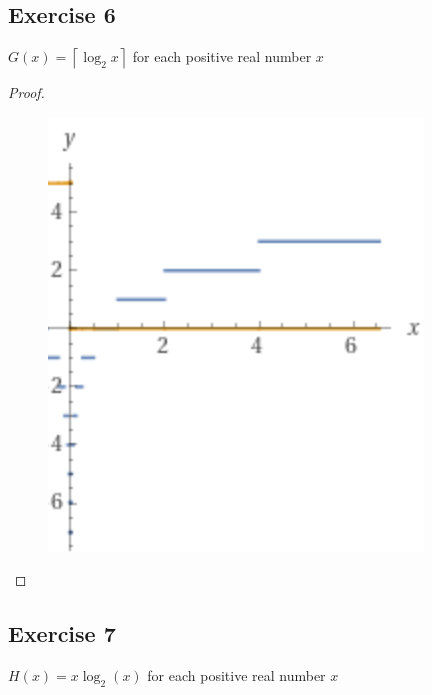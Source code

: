 \documentclass[14pt]{extarticle}
\newcommand{\ceil}[1]{{\left\lceil#1\right\rceil}}
\begin{document}
\subsection{Exercise 6}
\(G(x) = \ceil{\log_2 x}\) for each positive real number \(x\)

\begin{proof}
    \begin{figure}[ht!]
        \centering
        \includegraphics[scale=0.5]{../images/11.4.6.png}
    \end{figure}
\end{proof}

\subsection{Exercise 7}
\(H(x) = x \log_2(x)\) for each positive real number \(x\)
\end{document}
